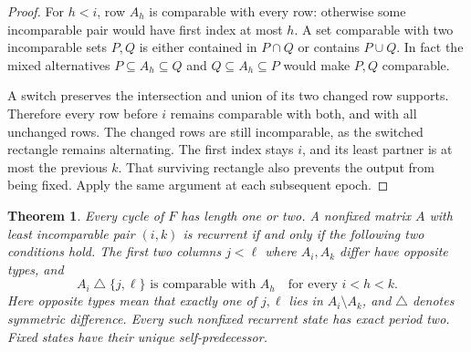 \documentclass[a4paper,10pt]{amsart}
\newtheorem{theorem}{Theorem}[section]
\theoremstyle{remark}
\begin{document}
\begin{proof}
For $h<i$, row $A_h$ is comparable with every row: otherwise some
incomparable pair would have first index at most $h$. A set comparable
with two incomparable sets $P,Q$ is either contained in $P\cap Q$ or
contains $P\cup Q$. In fact the mixed alternatives
$P\subseteq A_h\subseteq Q$ and $Q\subseteq A_h\subseteq P$
would make $P,Q$ comparable.

A switch preserves the intersection and union of its two changed row
supports. Therefore every row before $i$ remains comparable with both,
and with all unchanged rows. The changed rows are still incomparable,
as the switched rectangle remains alternating. The first index stays
$i$, and its least partner is at most the previous $k$. That surviving
rectangle also prevents the output from being fixed. Apply the same
argument at each subsequent epoch.
\end{proof}

\begin{theorem}\label{thm:recurrent}
Every cycle of $F$ has length one or two. A nonfixed matrix $A$ with
least incomparable pair $(i,k)$ is recurrent if and only if the
following two conditions hold. The first two columns $j<\ell$ where
$A_i,A_k$ differ have opposite types, and
\begin{equation}\label{eq:recurrent}
 A_i\mathbin{\triangle}\{j,\ell\}\text{ is comparable with }A_h
 \quad\text{for every }i<h<k.
\end{equation}
Here opposite types mean that exactly one of $j,\ell$ lies in
$A_i\setminus A_k$, and $\triangle$ denotes symmetric difference.
Every such nonfixed recurrent state has exact period two. Fixed states
have their unique self-predecessor.
\end{theorem}
\end{document}
